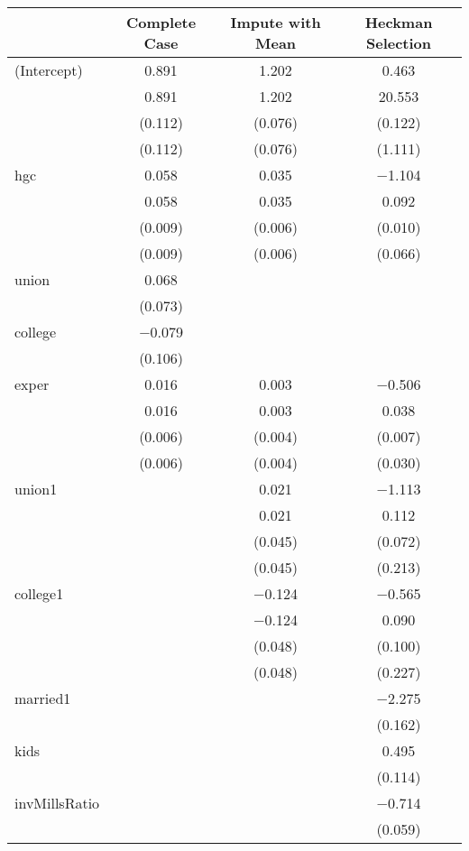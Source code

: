 \documentclass{article}
\begin{document}
\begin{table}
\centering
\begin{tabular}[t]{lccc}
\toprule
  & Complete Case & Impute with Mean & Heckman Selection\\
\midrule
(Intercept) & \num{0.891} & \num{1.202} & \num{0.463}\\
 & \num{0.891} & \num{1.202} & \num{20.553}\\
 & (\num{0.112}) & (\num{0.076}) & (\num{0.122})\\
 & (\num{0.112}) & (\num{0.076}) & (\num{1.111})\\
hgc & \num{0.058} & \num{0.035} & \num{-1.104}\\
 & \num{0.058} & \num{0.035} & \num{0.092}\\
 & (\num{0.009}) & (\num{0.006}) & (\num{0.010})\\
 & (\num{0.009}) & (\num{0.006}) & (\num{0.066})\\
union & \num{0.068} &  & \\
 & (\num{0.073}) &  & \\
college & \num{-0.079} &  & \\
 & (\num{0.106}) &  & \\
exper & \num{0.016} & \num{0.003} & \num{-0.506}\\
 & \num{0.016} & \num{0.003} & \num{0.038}\\
 & (\num{0.006}) & (\num{0.004}) & (\num{0.007})\\
 & (\num{0.006}) & (\num{0.004}) & (\num{0.030})\\
union1 &  & \num{0.021} & \num{-1.113}\\
 &  & \num{0.021} & \num{0.112}\\
 &  & (\num{0.045}) & (\num{0.072})\\
 &  & (\num{0.045}) & (\num{0.213})\\
college1 &  & \num{-0.124} & \num{-0.565}\\
 &  & \num{-0.124} & \num{0.090}\\
 &  & (\num{0.048}) & (\num{0.100})\\
 &  & (\num{0.048}) & (\num{0.227})\\
married1 &  &  & \num{-2.275}\\
 &  &  & (\num{0.162})\\
kids &  &  & \num{0.495}\\
 &  &  & (\num{0.114})\\
invMillsRatio &  &  & \num{-0.714}\\
 &  &  & (\num{0.059})\\

\end{tabular}
\end{table}
\end{document}
